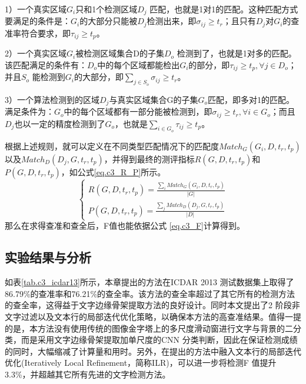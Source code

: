         1）一个真实区域$G_i$只和1个检测区域$D_j$ 匹配，也就是1对1的匹配。这种匹配方式要满足的条件是：$G_i$的大部分只能被$D_j$检测出来，即$\sigma_{ij} \ge t_r$；且只有$D_j$对$G_i$的查准率符合要求，即$\tau_{ij} \ge t_p$。

        2）一个真实区域$G_i$被检测区域集合D的子集$D_o$ 检测到了，也就是1对多的匹配。该匹配满足的条件有：$D_o$中的每个区域都能检出$G_i$的部分，即$\tau_{ij} \ge t_p,\forall j \in D_o$；并且$S_o$ 能检测到$G_i$的大部分，即$\sum_{j \in S_o} \sigma_{ij} \ge t_r$。

        3）一个算法检测到的区域$D_j$与真实区域集合G的子集$G_o$匹配，即多对1的匹配。满足条件为：$G_o$中的每个区域都有一部分能被检测到，即$\sigma_{ij} \ge t_r,\forall i \in G_o$；而且$D_j$也以一定的精度检测到了$G_o$，也就是$\sum_{i \in G_o} \tau_{ij} \ge t_p$。

        根据上述规则，就可以定义在不同类型匹配情况下的匹配度$Match_G(G_i,D,t_r,t_p)$以及$Match_D(D_j,G,t_r,t_p)$，并得到最终的测评指标$R(G,D,t_r,t_p)$和$P(G,D,t_r,t_p)$，如公式\ref{eq.c3_R_P}所示。
        \begin{equation}
        \left\{
        \begin{array}{c}
        R(G,D,t_r,t_p)=\frac{\sum_i Match_G(G_i,D,t_r,t_p)}{|G|}\\
        P(G,D,t_r,t_p)=\frac{\sum_j Match_D(D_j,G,t_r,t_p)}{|D|}
        \end{array}
        \right.
        \label{eq.c3_R_P}
        \end{equation}
        那么在求得查准和查全后，F值也能依据公式 \ref{eq.c3_F}计算得到。

        \subsection{实验结果与分析}

        如表\ref{tab.c3_icdar13}所示，本章提出的方法在ICDAR 2013 测试数据集上取得了86.79\%的查准率和76.21\%的查全率。该方法的查全率超过了其它所有的检测方法的查全率，这得益于文字边缘骨架提取方法的良好设计。同时本文提出了2 阶段非文字过滤以及文本行的局部迭代优化策略，以确保本方法的高查准结果。值得一提的是，本方法没有使用传统的图像金字塔上的多尺度滑动窗进行文字与背景的二分类，而是采用文字边缘骨架提取加单尺度的CNN 分类判断，因此在保证检测成绩的同时，大幅缩减了计算量和用时。另外，在提出的方法中融入文本行的局部迭代优化(Iteratively Local Refinement，简称ILR)，可以进一步将检测F 值提升3.3\%，并超越其它所有先进的文字检测方法。

